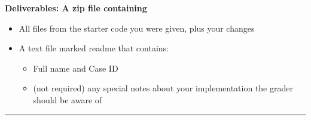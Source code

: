 \documentclass[a4paper, 11pt]{article}
\begin{document}
\bf{Deliverables:} A zip file containing
\begin{itemize}
    \item All files from the starter code you were given, plus your changes
    \item A text file marked readme that contains:
          \begin{itemize}
              \item Full name and Case ID
              \item (not required) any special notes about your implementation the grader should be aware of
          \end{itemize}
\end{itemize}

\noindent\rule{7in}{2.8pt}
\end{document}
